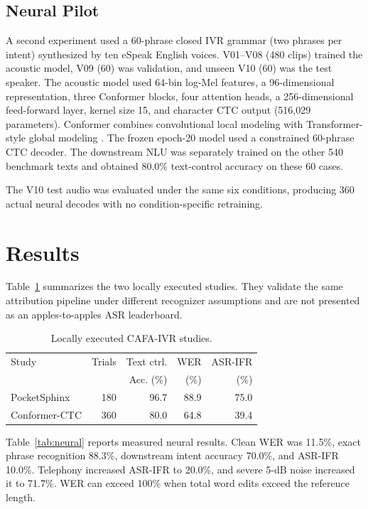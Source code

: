 \documentclass[conference]{IEEEtran}
\begin{document}
\subsection{Neural Pilot}
A second experiment used a 60-phrase closed IVR grammar (two phrases per intent) synthesized by ten eSpeak English voices. V01--V08 (480 clips) trained the acoustic model, V09 (60) was validation, and unseen V10 (60) was the test speaker. The acoustic model used 64-bin log-Mel features, a 96-dimensional representation, three Conformer blocks, four attention heads, a 256-dimensional feed-forward layer, kernel size 15, and character CTC output (516,029 parameters). Conformer combines convolutional local modeling with Transformer-style global modeling \cite{gulati2020}. The frozen epoch-20 model used a constrained 60-phrase CTC decoder. The downstream NLU was separately trained on the other 540 benchmark texts and obtained 80.0\% text-control accuracy on these 60 cases.

The V10 test audio was evaluated under the same six conditions, producing 360 actual neural decodes with no condition-specific retraining.

\section{Results}
Table~\ref{tab:studies} summarizes the two locally executed studies. They validate the same attribution pipeline under different recognizer assumptions and are not presented as an apples-to-apples ASR leaderboard.

\begin{table}[t]
\caption{Locally executed CAFA-IVR studies.}
\label{tab:studies}
\centering\scriptsize
\begin{tabular}{lrrrr}
\toprule
Study & Trials & Text ctrl. & WER & ASR-IFR\\
 & & Acc. (\%) & (\%) & (\%)\\
\midrule
PocketSphinx & 180 & 96.7 & 88.9 & 75.0\\
Conformer-CTC & 360 & 80.0 & 64.8 & 39.4\\
\bottomrule
\end{tabular}
\end{table}

Table~\ref{tab:neural} reports measured neural results. Clean WER was 11.5\%, exact phrase recognition 88.3\%, downstream intent accuracy 70.0\%, and ASR-IFR 10.0\%. Telephony increased ASR-IFR to 20.0\%, and severe 5-dB noise increased it to 71.7\%. WER can exceed 100\% when total word edits exceed the reference length.
\end{document}
